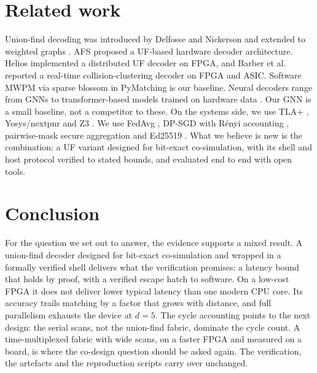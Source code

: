 \documentclass[10pt]{article}
\begin{document}
\section{Related work}
Union-find decoding was introduced by Delfosse and Nickerson \cite{delfosse2021uf} and extended to weighted
graphs \cite{huang2020weighted}. AFS \cite{das2022afs} proposed a UF-based hardware decoder architecture.
Helios \cite{liyanage2023helios} implemented a distributed UF decoder on FPGA, and Barber et
al.\ \cite{barber2023realtime} reported a real-time collision-clustering decoder on FPGA and ASIC. Software
MWPM via sparse blossom \cite{higgott2023sparse} in PyMatching \cite{higgott2022pymatching} is our baseline.
Neural decoders range from GNNs \cite{lange2023gnn} to transformer-based models trained on hardware data
\cite{bausch2024alphaqubit}. Our GNN is a small baseline, not a competitor to these. On the systems side, we
use TLA+ \cite{lamport2002tla}, Yosys/nextpnr \cite{shah2019nextpnr} and Z3 \cite{demoura2008z3}. We use FedAvg
\cite{mcmahan2017fedavg}, DP-SGD \cite{abadi2016dpsgd} with R\'enyi accounting \cite{mironov2017rdp,yousefpour2021opacus},
pairwise-mask secure aggregation \cite{bonawitz2017secagg} and Ed25519 \cite{bernstein2012ed25519}. What we
believe is new is the combination: a UF variant designed for bit-exact co-simulation, with its shell and host
protocol verified to stated bounds, and evaluated end to end with open tools.

\section{Conclusion}
For the question we set out to answer, the evidence supports a mixed result. A union-find decoder designed for
bit-exact co-simulation and wrapped in a formally verified shell delivers what the verification promises: a
latency bound that holds by proof, with a verified escape hatch to software. On a low-cost FPGA it does not deliver
lower typical latency than one modern CPU core. Its accuracy trails matching by a factor that grows with distance,
and full parallelism exhausts the device at $d=5$. The cycle accounting points to the next design: the serial
scans, not the union-find fabric, dominate the cycle count. A time-multiplexed fabric with wide scans, on a faster
FPGA and measured on a board, is where the co-design question should be asked again. The verification, the
artefacts and the reproduction scripts carry over unchanged.



\end{document}
